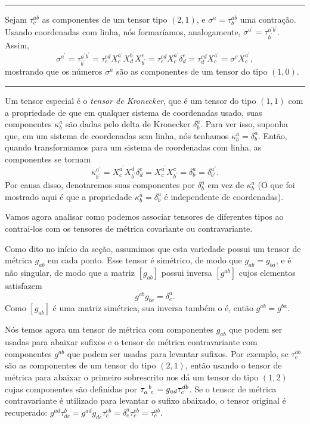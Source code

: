 \noindent
\rule{\textwidth}{0.4pt}
\begin{exemplo}
Sejam $\tau^{ab}_c$ as componentes de um tensor tipo $(2,1)$, e $\sigma^a=\tau^{ab}_b$ uma contração. Usando coordenadas com linha, nós formaríamos, analogamente, $\sigma^{a^\prime}=\tau^{a^\prime b^\prime}_{b^\prime}$. Assim,
\[
	\sigma^{a^{\prime}}=\tau_{b^{\prime}}^{a^{\prime} b^{\prime}}=\tau_{e}^{c d} X_{c}^{a^{\prime}} X_{d}^{b^{\prime}} X_{b^{\prime}}^{e}=\tau_{e}^{c d} X_{c}^{a^{\prime}} \delta_{d}^{e}=\tau_{d}^{c d} X_{c}^{a^{\prime}}=\sigma^{c} X_{c}^{a^{\prime}} ,
\]
mostrando que os números $\sigma^a$ são as componentes de um tensor do tipo $(1,0)$.

\noindent
\rule{\textwidth}{0.4pt}	
\end{exemplo}

Um tensor especial é o \textit{tensor de Kronecker}, que é um tensor do tipo $(1,1)$ com a propriedade de que em qualquer sistema de coordenadas usado, suas componentes $\kappa^a_b$ são dadas pelo delta de Kronecker $\delta^a_b$. Para ver isso, suponha que, em um sistema de coordenadas sem linha, nós tenhamos $\kappa_b^a=\delta^a_b$. Então, quando transformamos para um sistema de coordenadas com linha, as componentes se tornam
\[
	\kappa^{a^\prime}_{b^\prime} = X^{a^\prime}_c X^d_{b^\prime}\delta^c_d = X^{a^\prime}_c X^c_{b^\prime} = \delta^a_b =\delta^{a'}_{b'} .
\]
Por causa disso, denotaremos suas componentes por $\delta^a_b$ em vez de $\kappa^a_b$ (O que foi mostrado aqui é que a propriedade $\kappa^a_b=\delta^a_b$ é independente de coordenadas).

Vamos agora analisar como podemos associar tensores de diferentes tipos ao contrai-los com os tensores de métrica covariante ou contravariante.

Como dito no início da seção, assumimos que esta variedade possui um tensor de métrica $g_{ab}$ em cada ponto. Esse tensor é simétrico, de modo que $g_{ab}=g_{ba}$, e é não singular, de modo que a matriz $[g_{ab}]$ possui inversa $[g^{ab}]$ cujos elementos satisfazem
\begin{equation}\label{eq:TensorMetricaDelta}
	g^{ab}g_{bc}=\delta^a_c .
\end{equation}
Como $[g_{ab}]$ é uma matriz simétrica, sua inversa também o é, então $g^{ab}=g^{ba}$.

Nós temos agora um tensor de métrica com componentes $g_{ab}$ que podem ser usadas para abaixar sufixos e o tensor de métrica contravariante com componentes $g^{ab}$ que podem ser usadas para levantar sufixos. Por exemplo, se $\tau^{ab}_c$ são as componentes de um tensor do tipo $(2,1)$, então usando o tensor de métrica para abaixar o primeiro sobrescrito nos dá um tensor do tipo $(1,2)$ cujas componentes são definidas por $\tensor{\tau}{_a^b_c} = g_{ad}\tau^{db}_c$. Se o tensor de métrica contravariante é utilizado para levantar o sufixo abaixado, o tensor original é recuperado: $g^{a d} \tau_{d c}^{b}=g^{a d} g_{d e} \tau_{c}^{e b}=\delta_{e}^{a} \tau_{c}^{e b}=\tau_{c}^{a b}$.

